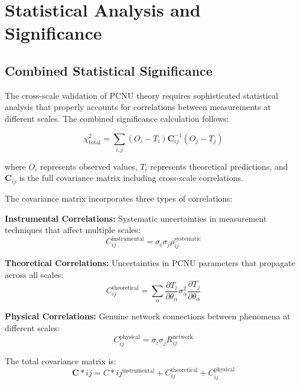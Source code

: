 \documentclass[11pt,a4paper]{article}
\begin{document}
\section{Statistical Analysis and Significance}

\subsection{Combined Statistical Significance}

The cross-scale validation of PCNU theory requires sophisticated statistical analysis that properly accounts for correlations between measurements at different scales. The combined significance calculation follows:

\begin{equation}
\chi^2_{\text{total}} = \sum_{i,j} (O_i - T_i) \mathbf{C}_{ij}^{-1} (O_j - T_j)
\label{eq:total_chi_squared}
\end{equation}

where $O_i$ represents observed values, $T_i$ represents theoretical predictions, and $\mathbf{C}_{ij}$ is the full covariance matrix including cross-scale correlations.

The covariance matrix incorporates three types of correlations:

\textbf{Instrumental Correlations:} Systematic uncertainties in measurement techniques that affect multiple scales:
\begin{equation}
C_{ij}^{\text{instrumental}} = \sigma_i \sigma_j \rho_{ij}^{\text{systematic}}
\label{eq:instrumental_covariance}
\end{equation}

\textbf{Theoretical Correlations:} Uncertainties in PCNU parameters that propagate across all scales:
\begin{equation}
C_{ij}^{\text{theoretical}} = \sum_{\alpha} \frac{\partial T_i}{\partial \theta_\alpha} \sigma_\alpha^2 \frac{\partial T_j}{\partial \theta_\alpha}
\label{eq:theoretical_covariance}
\end{equation}

\textbf{Physical Correlations:} Genuine network connections between phenomena at different scales:
\begin{equation}
C_{ij}^{\text{physical}} = \sigma_i \sigma_j R_{ij}^{\text{network}}
\label{eq:physical_covariance}
\end{equation}

The total covariance matrix is:
\begin{equation}
\mathbf{C}*{ij} = C*{ij}^{\text{instrumental}} + C_{ij}^{\text{theoretical}} + C_{ij}^{\text{physical}}
\label{eq:total_covariance}
\end{equation}
\end{document}
